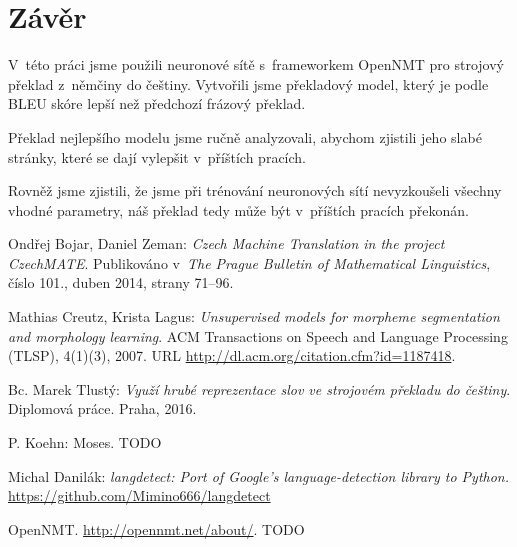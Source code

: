 \documentclass[a4]{article}
\begin{document}
\section{Závěr}

V~této práci jsme použili neuronové sítě s~frameworkem OpenNMT pro strojový
překlad z~němčiny do češtiny. Vytvořili jsme překladový model, který je podle
BLEU skóre lepší než předchozí frázový překlad. 

Překlad nejlepšího modelu jsme ručně analyzovali, abychom zjistili jeho slabé
stránky, které se dají vylepšit v~příštích pracích.

Rovněž jsme zjistili, že jsme při trénování neuronových sítí nevyzkoušeli
všechny vhodné parametry, náš překlad tedy může být v~příštích pracích překonán.

\begin{thebibliography}{99}



 Ondřej Bojar, Daniel Zeman: {\sl Czech Machine Translation in the project
 CzechMATE}. Publikováno v~{\sl The Prague Bulletin of Mathematical
 Linguistics}, číslo 101., duben 2014, strany 71–96.

	Mathias Creutz, Krista Lagus: {\sl Unsupervised models for morpheme
	segmentation and
	morphology learning}. ACM Transactions on Speech and Language Processing
	(TLSP), 4(1)(3),
	2007. URL \url{http://dl.acm.org/citation.cfm?id=1187418}.

 Bc. Marek Tlustý: {\sl  Využí hrubé reprezentace slov ve strojovém
překladu do češtiny}. Diplomová práce. Praha, 2016.

 P. Koehn: Moses. TODO 



 Michal Danilák: {\sl langdetect: Port of Google's language-detection library to
 Python.}
 \url{https://github.com/Mimino666/langdetect}

 OpenNMT. \url{http://opennmt.net/about/}. TODO





\end{thebibliography}
\end{document}
